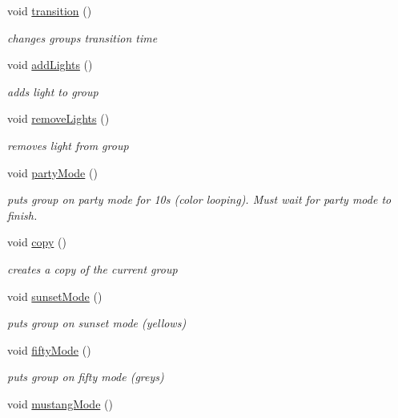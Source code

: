 \begin{DoxyCompactItemize}
void \hyperlink{classSingleGroupsControlWidget_a7ac224c22be007e2e3d944a5d93a2778}{transition} ()
\begin{DoxyCompactList}\small\item\em changes group\textquotesingle{}s transition time \end{DoxyCompactList}\item 
void \hyperlink{classSingleGroupsControlWidget_a3d83beb8c90183e11332bba1a4eab77d}{add\+Lights} ()
\begin{DoxyCompactList}\small\item\em adds light to group \end{DoxyCompactList}\item 
void \hyperlink{classSingleGroupsControlWidget_ab0729c8bad3c8ba43a22ed1af23ac6e7}{remove\+Lights} ()
\begin{DoxyCompactList}\small\item\em removes light from group \end{DoxyCompactList}\item 
void \hyperlink{classSingleGroupsControlWidget_a558dac00b479b6640de62b4812802250}{party\+Mode} ()
\begin{DoxyCompactList}\small\item\em puts group on party mode for 10s (color looping). Must wait for party mode to finish. \end{DoxyCompactList}\item 
void \hyperlink{classSingleGroupsControlWidget_a01caf0d1f2b7b8547d62009046c8d0bd}{copy} ()
\begin{DoxyCompactList}\small\item\em creates a copy of the current group \end{DoxyCompactList}\item 
void \hyperlink{classSingleGroupsControlWidget_a6cb68bd462d888756deba16b4e524470}{sunset\+Mode} ()
\begin{DoxyCompactList}\small\item\em puts group on sunset mode (yellows) \end{DoxyCompactList}\item 
void \hyperlink{classSingleGroupsControlWidget_a98a8fc3336b6d6a0ab087936c74955cc}{fifty\+Mode} ()
\begin{DoxyCompactList}\small\item\em puts group on fifty mode (greys) \end{DoxyCompactList}\item 
void \hyperlink{classSingleGroupsControlWidget_ad378bb04e410f93fd50eddc38c47d6d9}{mustang\+Mode} ()

\end{DoxyCompactItemize}
